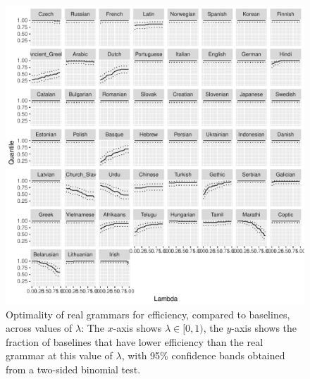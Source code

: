 \documentclass[10pt,twoside,lineno]{article}
\begin{document}
\begin{figure}
\centering
\includegraphics[width=\textwidth]{../results/plane/analyze_pareto_optimality/figures/quantileByLambda.pdf}
	\caption[]{Optimality of real grammars for efficiency, compared to baselines, across values of $\lambda$: The $x$-axis shows $\lambda \in [0,1)$, the $y$-axis shows the fraction of baselines that have lower efficiency than the real grammar at this value of $\lambda$, with 95\% confidence bands obtained from a two-sided binomial test.}\label{fig:lambda-quantile}
\end{figure}



\end{document}
